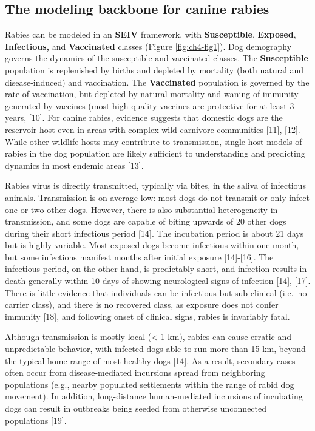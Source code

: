 \documentclass[
  oneside]{book}
\begin{document}
\hypertarget{the-modeling-backbone-for-canine-rabies}{%
\subsection{The modeling backbone for canine rabies}\label{the-modeling-backbone-for-canine-rabies}}

Rabies can be modeled in an \textbf{SEIV} framework, with \textbf{Susceptible},
\textbf{Exposed}, \textbf{Infectious,} and \textbf{Vaccinated} classes (Figure \ref{fig:ch4-fig1}).
Dog demography governs the dynamics of the susceptible and vaccinated
classes. The \textbf{Susceptible} population is replenished by births and
depleted by mortality (both natural and disease-induced) and
vaccination. The \textbf{Vaccinated} population is governed by the rate of
vaccination, but depleted by natural mortality and waning of immunity
generated by vaccines (most high quality vaccines are protective for at
least 3 years, {[}10{]}. For canine rabies, evidence suggests that
domestic dogs are the reservoir host even in areas with complex wild
carnivore communities {[}11{]}, {[}12{]}. While other wildlife hosts may
contribute to transmission, single-host models of rabies in the dog
population are likely sufficient to understanding and predicting
dynamics in most endemic areas {[}13{]}.

Rabies virus is directly transmitted, typically via bites, in the saliva
of infectious animals. Transmission is on average low: most dogs do not
transmit or only infect one or two other dogs. However, there is also
substantial heterogeneity in transmission, and some dogs are capable of
biting upwards of 20 other dogs during their short infectious period
{[}14{]}. The incubation period is about 21 days but is highly variable.
Most exposed dogs become infectious within one month, but some
infections manifest months after initial exposure {[}14{]}-{[}16{]}. The
infectious period, on the other hand, is predictably short, and
infection results in death generally within 10 days of showing
neurological signs of infection {[}14{]}, {[}17{]}. There is little evidence
that individuals can be infectious but sub-clinical (i.e.~no carrier
class), and there is no recovered class, as exposure does not confer
immunity {[}18{]}, and following onset of clinical signs, rabies is
invariably fatal.

Although transmission is mostly local (\textless{} 1 km), rabies can cause
erratic and unpredictable behavior, with infected dogs able to run more
than 15 km, beyond the typical home range of most healthy dogs {[}14{]}.
As a result, secondary cases often occur from disease-mediated
incursions spread from neighboring populations (e.g., nearby populated
settlements within the range of rabid dog movement). In addition,
long-distance human-mediated incursions of incubating dogs can result in
outbreaks being seeded from otherwise unconnected populations {[}19{]}.
\end{document}
